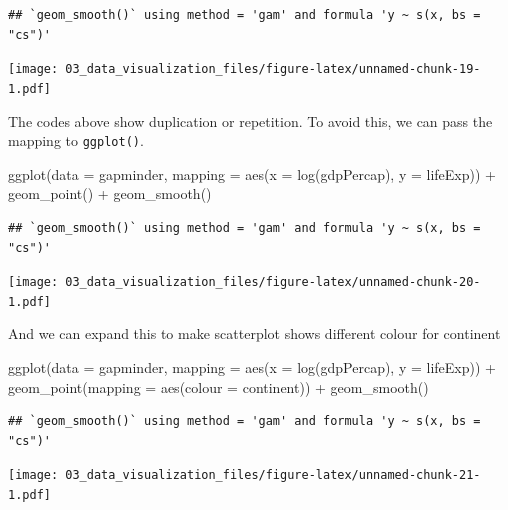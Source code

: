 \documentclass[
  10pt,
]{krantz}
\newenvironment{Shaded}{\begin{snugshade}}{\end{snugshade}}
\newcommand{\AttributeTok}[1]{\textcolor[rgb]{0.77,0.63,0.00}{#1}}
\newcommand{\FunctionTok}[1]{\textcolor[rgb]{0.00,0.00,0.00}{#1}}
\newcommand{\NormalTok}[1]{#1}
\newcommand{\SpecialCharTok}[1]{\textcolor[rgb]{0.00,0.00,0.00}{#1}}
\begin{document}
\begin{verbatim}
## `geom_smooth()` using method = 'gam' and formula 'y ~ s(x, bs = "cs")'
\end{verbatim}

\texttt{[image: 03\_data\_visualization\_files/figure-latex/unnamed-chunk-19-1.pdf]}

The codes above show duplication or repetition. To avoid this, we can pass the mapping to \texttt{ggplot()}.

\begin{Shaded}
\begin{Highlighting}[]
\FunctionTok{ggplot}\NormalTok{(}\AttributeTok{data =}\NormalTok{ gapminder, }
       \AttributeTok{mapping =} \FunctionTok{aes}\NormalTok{(}\AttributeTok{x =} \FunctionTok{log}\NormalTok{(gdpPercap), }\AttributeTok{y =}\NormalTok{ lifeExp)) }\SpecialCharTok{+}
  \FunctionTok{geom\_point}\NormalTok{() }\SpecialCharTok{+}
  \FunctionTok{geom\_smooth}\NormalTok{()}
\end{Highlighting}
\end{Shaded}

\begin{verbatim}
## `geom_smooth()` using method = 'gam' and formula 'y ~ s(x, bs = "cs")'
\end{verbatim}

\texttt{[image: 03\_data\_visualization\_files/figure-latex/unnamed-chunk-20-1.pdf]}

And we can expand this to make scatterplot shows different colour for continent

\begin{Shaded}
\begin{Highlighting}[]
\FunctionTok{ggplot}\NormalTok{(}\AttributeTok{data =}\NormalTok{ gapminder, }
       \AttributeTok{mapping =} \FunctionTok{aes}\NormalTok{(}\AttributeTok{x =} \FunctionTok{log}\NormalTok{(gdpPercap), }\AttributeTok{y =}\NormalTok{ lifeExp)) }\SpecialCharTok{+}
  \FunctionTok{geom\_point}\NormalTok{(}\AttributeTok{mapping =} \FunctionTok{aes}\NormalTok{(}\AttributeTok{colour =}\NormalTok{ continent)) }\SpecialCharTok{+}
  \FunctionTok{geom\_smooth}\NormalTok{()}
\end{Highlighting}
\end{Shaded}

\begin{verbatim}
## `geom_smooth()` using method = 'gam' and formula 'y ~ s(x, bs = "cs")'
\end{verbatim}

\texttt{[image: 03\_data\_visualization\_files/figure-latex/unnamed-chunk-21-1.pdf]}
\end{document}
